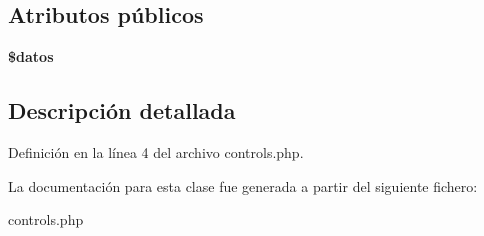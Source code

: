 \subsection*{\-Atributos públicos}
\begin{DoxyCompactItemize}
\item 
\hypertarget{classcontrols_abda28107af4943a229e1346924684183}{{\bfseries \$datos}}\label{classcontrols_abda28107af4943a229e1346924684183}

\end{DoxyCompactItemize}


\subsection{\-Descripción detallada}


\-Definición en la línea 4 del archivo controls.\-php.



\-La documentación para esta clase fue generada a partir del siguiente fichero\-:\begin{DoxyCompactItemize}
\item 
controls.\-php\end{DoxyCompactItemize}
